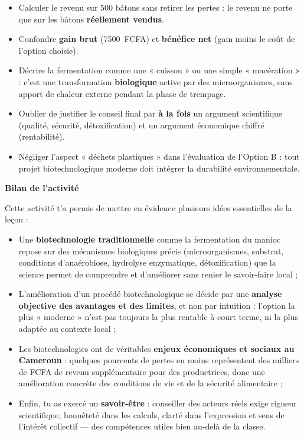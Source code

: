 \documentclass[11pt]{article}
\begin{document}
\begin{attention}
\begin{itemize}
\item Calculer le revenu sur 500 bâtons sans retirer les pertes : le revenu ne porte que sur les bâtons \textbf{réellement vendus}.
\item Confondre \textbf{gain brut} (\SI{7 500}{FCFA}) et \textbf{bénéfice net} (gain moins le coût de l'option choisie).
\item Décrire la fermentation comme une « cuisson » ou une simple « macération » : c'est une transformation \textbf{biologique} active par des microorganismes, sans apport de chaleur externe pendant la phase de trempage.
\item Oublier de justifier le conseil final par \textbf{à la fois} un argument scientifique (qualité, sécurité, détoxification) et un argument économique chiffré (rentabilité).
\item Négliger l'aspect « déchets plastiques » dans l'évaluation de l'Option B : tout projet biotechnologique moderne doit intégrer la durabilité environnementale.
\end{itemize}
\end{attention}

\textbf{Bilan de l'activité}

Cette activité t'a permis de mettre en évidence plusieurs idées essentielles de la leçon :

\begin{itemize}
\item Une \textbf{biotechnologie traditionnelle} comme la fermentation du manioc repose sur des mécanismes biologiques précis (microorganismes, substrat, conditions d'anaérobiose, hydrolyse enzymatique, détoxification) que la science permet de comprendre et d'améliorer sans renier le savoir-faire local ;
\item L'amélioration d'un procédé biotechnologique se décide par une \textbf{analyse objective des avantages et des limites}, et non par intuition : l'option la plus « moderne » n'est pas toujours la plus rentable à court terme, ni la plus adaptée au contexte local ;
\item Les biotechnologies ont de véritables \textbf{enjeux économiques et sociaux au Cameroun} : quelques pourcents de pertes en moins représentent des milliers de FCFA de revenu supplémentaire pour des productrices, donc une amélioration concrète des conditions de vie et de la sécurité alimentaire ;
\item Enfin, tu as exercé un \textbf{savoir-être} : conseiller des acteurs réels exige rigueur scientifique, honnêteté dans les calculs, clarté dans l'expression et sens de l'intérêt collectif — des compétences utiles bien au-delà de la classe.
\end{itemize}
\end{document}
